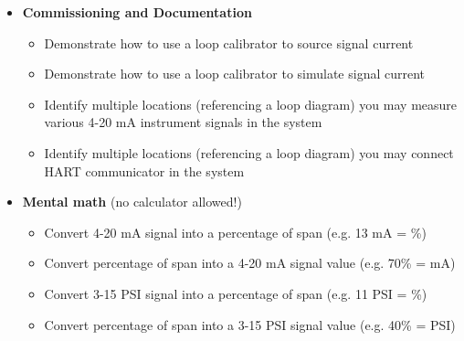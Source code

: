 \filbreak

\begin{itemize}
\item{} {\bf Commissioning and Documentation}
\begin{itemize}

\item{} Demonstrate how to use a loop calibrator to source signal current
\item{} Demonstrate how to use a loop calibrator to simulate signal current
\item{} Identify multiple locations (referencing a loop diagram) you may measure various 4-20 mA instrument signals in the system
\item{} Identify multiple locations (referencing a loop diagram) you may connect HART communicator in the system
\end{itemize}
\end{itemize}

\filbreak

\begin{itemize}
\item{} {\bf Mental math} (no calculator allowed!)
\begin{itemize}

\item{} Convert 4-20 mA signal into a percentage of span (e.g. 13 mA = \underbar{\hskip 20pt}\%)
\item{} Convert percentage of span into a 4-20 mA signal value (e.g. 70\% = \underbar{\hskip 20pt} mA)
\item{} Convert 3-15 PSI signal into a percentage of span (e.g. 11 PSI = \underbar{\hskip 20pt}\%)
\item{} Convert percentage of span into a 3-15 PSI signal value (e.g. 40\% = \underbar{\hskip 20pt} PSI)
\end{itemize}
\end{itemize}

\filbreak

